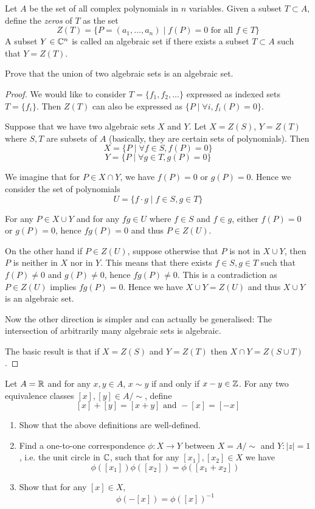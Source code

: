 \begin{exercise}
Let $A$ be the set of all complex polynomials in $n$ variables. Given a subset $T \subset A$, define the \textit{zeros} of $T$ as the set
\[ Z(T) = \{P=(a_1,\dots,a_n) \mid f(P)=0 \text{ for all } f \in T\} \]
A subset $Y \in \mathbb C^n$ is called an algebraic set if there exists a subset $T \subset A$ such that $Y=Z(T)$.

Prove that the union of two algebraic sets is an algebraic set.
\end{exercise}
\begin{proof}
We would like to consider $T=\{f_1, f_2, \dots\}$ expressed as indexed sets $T=\{f_i\}$. Then $Z(T)$ can also be expressed as $\{P \mid \forall i, f_i(P)=0\}$.

Suppose that we have two algebraic sets $X$ and $Y$. Let $X=Z(S)$, $Y=Z(T)$ where $S,T$ are subsets of $A$ (basically, they are certain sets of polynomials). Then
\[ X=\{P \mid \forall f \in S, f(P)=0\} \]
\[ Y=\{P \mid \forall g \in T, g(P)=0\} \]

We imagine that for $P\in X\cap Y$, we have $f(P)=0$ or $g(P)=0$. Hence we consider the set of polynomials
\[ U=\{f\cdot g \mid f\in S, g\in T\} \]

For any $P\in X\cup Y$ and for any $fg\in U$ where $f\in S$ and $f\in g$, either $f(P)=0$ or $g(P)=0$, hence $fg(P)=0$ and thus $P\in Z(U)$.

On the other hand if $P\in Z(U)$, suppose otherwise that $P$ is not in $X\cup Y$, then $P$ is neither in $X$ nor in $Y$. This means that there exists $f\in S,g\in T$ such that $f(P)\neq0$ and $g(P)\neq0$, hence $fg(P)\neq0$. This is a contradiction as $P\in Z(U)$ implies $fg(P)=0$. Hence we have $X\cup Y=Z(U)$ and thus $X\cup Y$ is an algebraic set.

Now the other direction is simpler and can actually be generalised: The intersection of arbitrarily many algebraic sets is algebraic. 

The basic result is that if $X=Z(S)$ and $Y=Z(T)$ then $X\cap Y=Z(S\cup T)$. 
\end{proof}

\begin{exercise}
Let $A=\mathbb R$ and for any $x, y \in A$, $x \sim y$ if and only if $x-y \in \mathbb Z$. For any two equivalence classes $[x], [y] \in A/\sim$, define
\[ [x] + [y] = [x + y] \text{ and } -[x] = [-x] \]
\begin{enumerate}[label=(\alph*)]
\item Show that the above definitions are well-defined.
\item Find a one-to-one correspondence $\phi:X \to Y$ between $X = A/\sim$ and $Y:|z| = 1$, i.e. the unit circle in $\mathbb C$, such that for any $[x_1], [x_2] \in X$ we have
\[ \phi([x_1])\phi([x_2]) = \phi([x_1 + x_2]) \]
\item Show that for any $[x] \in X$,
\[ \phi(-[x]) = \phi([x])^{-1} \]
\end{enumerate}
\end{exercise}

